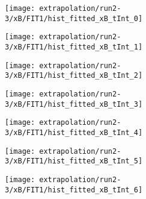 \begin{figure}
	\centering
	\caption{Fit to the flask subtracted yield ratio with FIT1 for $x_B$ for run 2-3.}
	\label{fig:run2-3_FIT1_xB}
	\begin{subfigure}{0.45\linewidth}
		\texttt{[image: extrapolation/run2-3/xB/FIT1/hist\_fitted\_xB\_tInt\_0]}
	\end{subfigure}
	\begin{subfigure}{0.45\linewidth}
		\texttt{[image: extrapolation/run2-3/xB/FIT1/hist\_fitted\_xB\_tInt\_1]}
	\end{subfigure}
	\begin{subfigure}{0.45\linewidth}
		\texttt{[image: extrapolation/run2-3/xB/FIT1/hist\_fitted\_xB\_tInt\_2]}
	\end{subfigure}
	\begin{subfigure}{0.45\linewidth}
		\texttt{[image: extrapolation/run2-3/xB/FIT1/hist\_fitted\_xB\_tInt\_3]}
	\end{subfigure}
	\begin{subfigure}{0.45\linewidth}
		\texttt{[image: extrapolation/run2-3/xB/FIT1/hist\_fitted\_xB\_tInt\_4]}
	\end{subfigure}
	\begin{subfigure}{0.45\linewidth}
		\texttt{[image: extrapolation/run2-3/xB/FIT1/hist\_fitted\_xB\_tInt\_5]}
	\end{subfigure}
	\begin{subfigure}{0.45\linewidth}
		\texttt{[image: extrapolation/run2-3/xB/FIT1/hist\_fitted\_xB\_tInt\_6]}
	\end{subfigure}
\end{figure}
